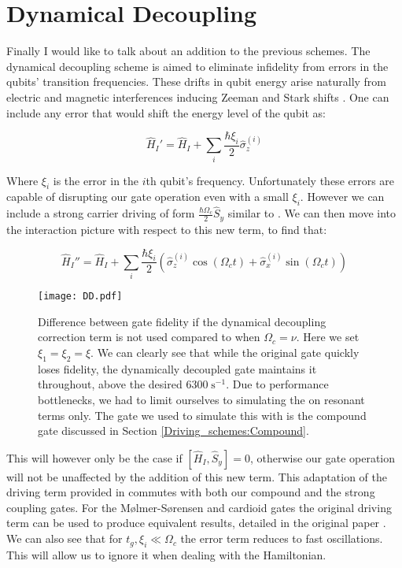 \documentclass[12pt,twoside]{report}
\begin{document}
\section{Dynamical Decoupling}
\label{Driving_schemes:DD}

Finally I would like to talk about an addition to the previous schemes. The dynamical decoupling scheme is aimed to eliminate infidelity from errors in the qubits' transition frequencies. These drifts in qubit energy arise naturally from electric and magnetic interferences inducing Zeeman and Stark shifts \cite{Foot}. One can include any error that would shift the energy level of the qubit as:

\begin{equation}
	\hat{H}_I' = \hat{H}_I + \sum_i \frac{\hbar \xi_i}{2} \hat{\sigma}_z^{\left(i\right)}
	\label{eq:qubit_err}
\end{equation}

Where $\xi_i$ is the error in the $i$th qubit's frequency. Unfortunately these errors are capable of disrupting our gate operation even with a small $\xi_i$. However we can include a strong carrier driving of form $\frac{\hbar \Omega_c}{2}\hat{S}_y$ similar to \cite{DD_Paper}. We can then move into the interaction picture with respect to this new term, to find that:

\begin{equation}
	\hat{H}_I'' = \hat{H}_I + \sum_i \frac{\hbar \xi_i}{2}\left(\hat{\sigma}_z^{\left(i\right)}\cos\left(\Omega_c t\right) + \hat{\sigma}_x^{\left(i\right)}\sin\left(\Omega_c t\right)\right)
	\label{eq:qubit_err_I}
\end{equation}

\begin{figure}[b!]
	\centering
	\texttt{[image: DD.pdf]}
	\caption[Dynamical Decoupling]{Difference between gate fidelity if the dynamical decoupling correction term is not used compared to when $\Omega_c=\nu$. Here we set $\xi_1 = \xi_2 = \xi$. We can clearly see that while the original gate quickly loses fidelity, the dynamically decoupled gate maintains it throughout, above the desired $6300\;\text{s}^{-1}$. Due to performance bottlenecks, we had to limit ourselves to simulating the on resonant terms only. The gate we used to simulate this with is the compound gate discussed in Section \ref{Driving_schemes:Compound}.}
	\label{fig:DD}
\end{figure}

This will however only be the case if $[\hat{H}_I,\hat{S}_y]=0$, otherwise our gate operation will not be unaffected by the addition of this new term. This adaptation of the driving term provided in \cite{DD_Paper} commutes with both our compound and the strong coupling gates. For the M\o lmer-S\o rensen and cardioid gates the original driving term can be used to produce equivalent results, detailed in the original paper \cite{DD_Paper}. We can also see that for $t_g, \xi_i \ll \Omega_c$ the error term reduces to fast oscillations. This will allow us to ignore it when dealing with the Hamiltonian.
\end{document}
